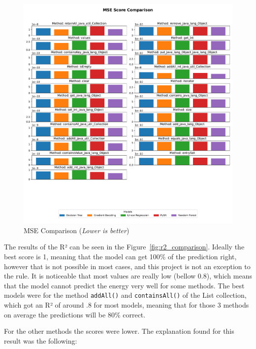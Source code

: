 \begin{figure}[htbp]
  \centering
  \includegraphics{figures/mse_comparison.pdf}
  \caption{MSE Comparison (\textit{Lower is better})}
  \label{fig:mse_comparison}
\end{figure}

The results of the R² can be seen in the Figure~\ref{fig:r2_comparison}.
Ideally the best score is 1, meaning that the model can get 100\% of the prediction right, however that is not possible in most cases, and this project is not an exception to the rule. It is noticeable that most values are really low (bellow 0.8), which means that the model cannot predict the energy very well for some methods. The best models were for the method \texttt{addAll()} and \texttt{containsAll()} of the List collection, which got an R² of around .8 for most models, meaning that for those 3 methods on average the predictions will be 80\% correct.

For the other methods the scores were lower. The explanation found for this result was the following:


